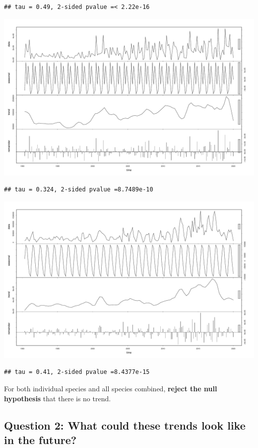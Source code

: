 \documentclass[
  12pt,
]{article}
\begin{document}
\begin{verbatim}
## tau = 0.49, 2-sided pvalue =< 2.22e-16
\end{verbatim}

\includegraphics{Report_FishTrends_files/figure-latex/unnamed-chunk-3-1.pdf}

\begin{verbatim}
## tau = 0.324, 2-sided pvalue =8.7489e-10
\end{verbatim}

\includegraphics{Report_FishTrends_files/figure-latex/unnamed-chunk-5-1.pdf}

\begin{verbatim}
## tau = 0.41, 2-sided pvalue =8.4377e-15
\end{verbatim}

For both individual species and all species combined, \textbf{reject the
null hypothesis} that there is no trend.

\hypertarget{question-2-what-could-these-trends-look-like-in-the-future}{%
\subsection{Question 2: What could these trends look like in the
future?}\label{question-2-what-could-these-trends-look-like-in-the-future}}
\end{document}
